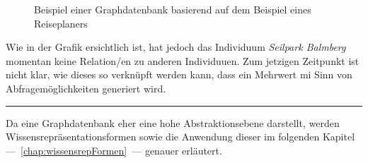 \begin{figure}[H]
\centering {}
\caption{Beispiel einer Graphdatenbank basierend auf dem Beispiel eines Reiseplaners\label{fig:protege}\protect\footnotemark}
\end{figure}

Wie in der Grafik ersichtlich ist, hat jedoch das Individuum \textit{Seilpark Balmberg} momentan keine Relation/en zu anderen Individuuen. Zum jetzigen Zeitpunkt ist nicht klar, wie dieses so verknüpft werden kann, dass ein Mehrwert mi Sinn von Abfragemöglichkeiten generiert wird.

\vspace{0.1pt}
\noindent\rule[1ex]{\textwidth}{1pt}

Da eine Graphdatenbank eher eine hohe Abstraktionsebene darstellt, werden Wissensrepräsentationsformen sowie die Anwendung dieser im folgenden Kapitel ---~\ref{chap:wissensrepFormen}~--- genauer erläutert.
